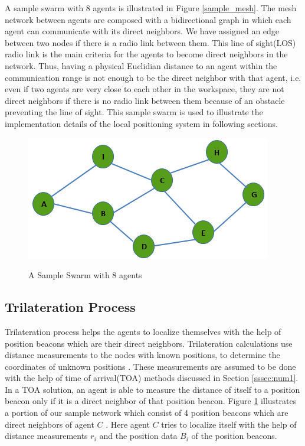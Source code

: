 A sample swarm with 8 agents is illustrated in Figure \ref{sample_mesh}. The mesh network between agents are composed with a bidirectional graph in which each agent can communicate with its direct neighbors. We have assigned an edge between two nodes if there is a radio link between them. This line of sight(LOS) radio link is the main criteria for the agents to become direct neighbors in the network. Thus, having a physical Euclidian distance to an agent within the communication range is not enough to be the direct neighbor with that agent, i.e. even if two agents are very close to each other in the workspace, they are not direct neighbors if there is no radio link between them because of an obstacle preventing the line of sight. This sample swarm is used to illustrate the implementation details of the local positioning system in following sections.

\begin{figure}[H] 
\caption{A Sample Swarm with 8 agents} \label{sample_mesh}
\centering
\includegraphics[scale = 0.65]{mesh}
\label{beacons_ref}
\end{figure}

\subsection{Trilateration Process}
Trilateration process helps the agents to localize themselves with the help of position beacons which are their direct neighbors.  Trilateration calculations use distance measurements to the nodes with known positions, to determine the coordinates of unknown positions \cite{22}. These measurements are assumed to be done with the help of time of arrival(TOA) methods discussed in Section \ref{sssec:num1}. In a TOA solution, an agent is able to measure the distance of itself to a position beacon only if it is a direct neighbor of that position beacon. Figure \ref{beacons_ref} illustrates a portion of our sample network which consist of 4 position beacons which are direct neighbors of agent $C$ . Here agent $C$ tries to localize itself with the help of distance measurements $r_i$ and the position data $B_i$ of the position beacons.

